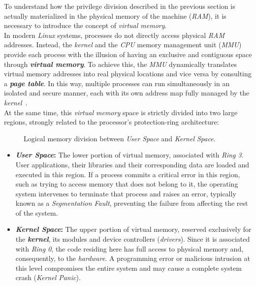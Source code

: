 To understand how the privilege division described in the previous section is actually materialized in the physical memory of the machine (\textit{RAM}), it is necessary to introduce the concept of \textit{virtual memory}.\\

In modern \textit{Linux} systems, processes do not directly access physical \textit{RAM} addresses.
Instead, the \textit{kernel} and the \textit{CPU} memory management unit (\textit{MMU}) provide each process with the illusion of having an exclusive and contiguous space through \textbf{\textit{virtual memory}}.
To achieve this, the \textit{MMU} dynamically translates virtual memory addresses into real physical locations and vice versa by consulting a \textbf{\textit{page table}}.
In this way, multiple processes can run simultaneously in an isolated and secure manner, each with its own address map fully managed by the \textit{kernel}~\cite{silberschatz_memoria}.\\

At the same time, this \textit{virtual memory} space is strictly divided into two large regions, strongly related to the processor's protection-ring architecture:

\begin{figure}[h!]
  \centering
  \scalebox{0.65}{}
  \caption{Logical memory division between \textit{User Space} and \textit{Kernel Space}.}
  \label{fig:usr_krn_memory}
\end{figure}

\begin{itemize}
    \item \textbf{\textit{User Space}:} The lower portion of virtual memory, associated with \textit{Ring 3}. User applications, their libraries and their corresponding data are loaded and executed in this region.
    If a process commits a critical error in this region, such as trying to access memory that does not belong to it, the operating system intervenes to terminate that process and raises an error, typically known as a \textit{Segmentation Fault}, preventing the failure from affecting the rest of the system.
    \item \textbf{\textit{Kernel Space}:} The upper portion of virtual memory, reserved exclusively for the \textbf{\textit{kernel}}, its modules and device controllers (\textit{drivers}).
    Since it is associated with \textit{Ring 0}, the code residing here has full access to physical memory and, consequently, to the \textit{hardware}. A programming error or malicious intrusion at this level compromises the entire system and may cause a complete system crash (\textit{Kernel Panic}).
\end{itemize}

